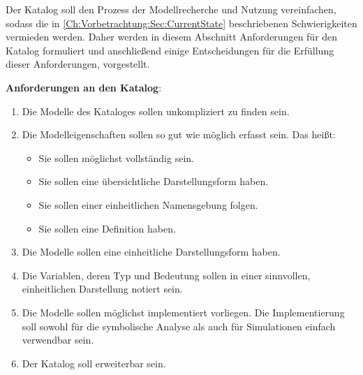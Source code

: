 Der Katalog soll den Prozess der Modellrecherche und Nutzung vereinfachen, sodass die in \autoref{Ch:Vorbetrachtung:Sec:CurrentState} beschriebenen Schwierigkeiten vermieden werden. Daher werden in diesem Abschnitt Anforderungen für den Katalog formuliert und anschließend einige Entscheidungen für die Erfüllung dieser Anforderungen, vorgestellt.

\textbf{Anforderungen an den Katalog}:
\begin{enumerate}[label=\textbf{Anforderung A.\arabic*}:, ref=\textbf{A.\arabic*}, wide=0pt, leftmargin=*]
	\item \label{A.Findbarkeit}Die Modelle des Kataloges sollen unkompliziert zu finden sein.
	\item \label{A.Modelleigenschaften}Die Modelleigenschaften sollen so gut wie möglich erfasst sein. Das heißt:
	\begin{itemize}[label=$\bullet$]
		\item Sie sollen möglichst vollständig sein.
		\item Sie sollen eine übersichtliche Darstellungsform haben.
		\item Sie sollen einer einheitlichen Namensgebung folgen.
		\item Sie sollen eine Definition haben.
	\end{itemize}
	\item \label{A.Darstellung_Gleichungen}Die Modelle sollen eine einheitliche Darstellungsform haben.
	\item \label{A.Darstellung_Variablen}Die Variablen, deren Typ und Bedeutung sollen in einer sinnvollen, einheitlichen Darstellung notiert sein.
	\item \label{A.Implementierung}Die Modelle sollen möglichst implementiert vorliegen. Die Implementierung soll sowohl für die symbolische Analyse als auch für Simulationen einfach verwendbar sein.
	\item \label{A.Erweiterbarkeit}Der Katalog soll erweiterbar sein. %
\end{enumerate}

